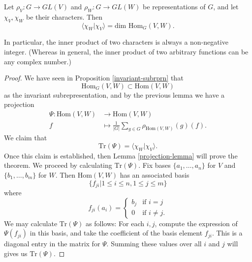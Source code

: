 \begin{thm}
Let $\rho_V \colon G \to GL(V)$ and $\rho_W \colon G \to GL(W)$ be representations of $G$, and let $\chi_V, \chi_W$ be their characters.  Then 
\[ \langle \chi_W | \chi_V \rangle = \text{dim Hom}_G (V,W). \]
\end{thm}
In particular, the inner product of two characters is always a non-negative integer.  (Whereas in general, the inner product of two arbitrary functions can be any complex number.)

\begin{proof}
We have seen in Proposition \ref{invariant-subrprn} that
 \[ \text{Hom}_G (V,W) \subset \text{Hom}(V,W) \] 
 as the invariant subrepresentation, and by the previous lemma we have a projection
\begin{align*}
\Psi \colon \text{Hom}(V,W) &\to \text{Hom}(V,W) \\
f &\mapsto \frac{1}{|G|} \sum_{g \in G} \rho_{\text{Hom}(V,W)} (g) (f).
\end{align*}
We claim that \[ \text{Tr} (\Psi) = \langle \chi_W | \chi_V \rangle. \]  Once this claim is established, then Lemma \ref{projection-lemma} will prove the theorem.  We proceed by calculating $\text{Tr} (\Psi)$.  Fix bases $\{ a_1, \ldots, a_n \}$ for $V$ and $\{ b_1, \ldots, b_m \}$ for $W$.  Then $\text{Hom}(V,W)$ has an associated basis 
\[ \{ f_{ji} | 1 \leq i \leq n, 1 \leq j \leq m\} \]
where
\[ f_{ji} (a_i) = \begin{cases} b_j &\text{if } i=j \\ 0 &\text{if } i \neq j.  \end{cases} \] 
We may calculate $\text{Tr}(\Psi)$ as follows:  For each $i,j$, compute the expression of $\Psi(f_{ji})$ in this basis, and take the coefficient of the basis element $f_{ji}$.  This is a diagonal entry in the matrix for $\Psi$. Summing these values over all $i$ and $j$ will gives us $\text{Tr}(\Psi)$.


\end{proof}
